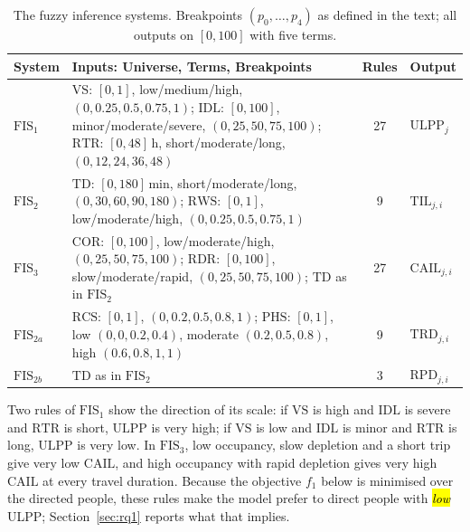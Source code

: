 \documentclass[systems,article,accept,moreauthors,pdftex]{Definitions/mdpi}
\begin{document}
\begin{table}[H]
\centering
\caption{The fuzzy inference systems. Breakpoints $(p_0,\ldots,p_4)$ as defined in the text;
all outputs on $[0,100]$ with five terms.\label{tab:fis}}
\small
\begin{tabularx}{\textwidth}{@{}l>{\raggedright\arraybackslash}Xcl@{}}
\toprule
\textbf{System} & \textbf{Inputs: Universe, Terms, Breakpoints} & \textbf{Rules} & \textbf{Output}\\
\midrule
$\mathrm{FIS}_1$ & $\mathrm{VS}$: $[0,1]$, low/medium/high, $(0,0.25,0.5,0.75,1)$;
$\mathrm{IDL}$: $[0,100]$, minor/moderate/severe, $(0,25,50,75,100)$;
$\mathrm{RTR}$: $[0,48]$\,h, short/moderate/long, $(0,12,24,36,48)$ & 27 & $\mathrm{ULPP}_j$\\
$\mathrm{FIS}_2$ & $\mathrm{TD}$: $[0,180]$\,min, short/moderate/long, $(0,30,60,90,180)$;
$\mathrm{RWS}$: $[0,1]$, low/moderate/high, $(0,0.25,0.5,0.75,1)$ & 9 & $\mathrm{TIL}_{j,i}$\\
$\mathrm{FIS}_3$ & $\mathrm{COR}$: $[0,100]$, low/moderate/high, $(0,25,50,75,100)$;
$\mathrm{RDR}$: $[0,100]$, slow/moderate/rapid, $(0,25,50,75,100)$;
$\mathrm{TD}$ as in $\mathrm{FIS}_2$ & 27 & $\mathrm{CAIL}_{j,i}$\\
\midrule
$\mathrm{FIS}_{2a}$ & $\mathrm{RCS}$: $[0,1]$, $(0,0.2,0.5,0.8,1)$; $\mathrm{PHS}$: $[0,1]$, low
$(0,0,0.2,0.4)$, moderate $(0.2,0.5,0.8)$, high $(0.6,0.8,1,1)$ & 9 & $\mathrm{TRD}_{j,i}$\\
$\mathrm{FIS}_{2b}$ & $\mathrm{TD}$ as in $\mathrm{FIS}_2$ & 3 & $\mathrm{RPD}_{j,i}$\\
\bottomrule
\end{tabularx}
\end{table}

Two rules of $\mathrm{FIS}_1$ show the direction of its scale: if $\mathrm{VS}$ is high and
$\mathrm{IDL}$ is severe and $\mathrm{RTR}$ is short, $\mathrm{ULPP}$ is very high; if
$\mathrm{VS}$ is low and $\mathrm{IDL}$ is minor and $\mathrm{RTR}$ is long, $\mathrm{ULPP}$ is
very low. In $\mathrm{FIS}_3$, low occupancy, slow depletion and a short trip give very low
$\mathrm{CAIL}$, and high occupancy with rapid depletion gives very high $\mathrm{CAIL}$ at
every travel duration.
Because the objective $f_1$ below is minimised over the directed people, these rules make the
model prefer to direct people with \emph{\hl{low}%
} ULPP; Section~\ref{sec:rq1} reports what that
implies.
\end{document}
